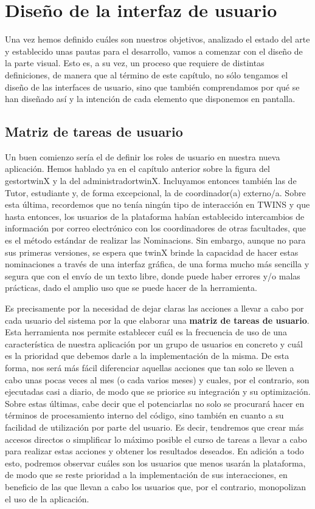 \chapter{Diseño de la interfaz de usuario}

Una vez hemos definido cuáles son nuestros objetivos, analizado el estado del arte y establecido unas pautas para el desarrollo, vamos a comenzar con el diseño de la parte visual. Esto es, a su vez, un proceso que requiere de distintas definiciones, de manera que al término de este capítulo, no sólo tengamos el diseño de las interfaces de usuario, sino que también comprendamos por qué se han diseñado así y la intención de cada elemento que disponemos en pantalla.

\section{Matriz de tareas de usuario}

Un buen comienzo sería el de definir los roles de usuario en nuestra nueva aplicación. Hemos hablado ya en el capítulo anterior sobre la figura del \gls{gestortwinX} y la del \gls{administradortwinX}. Incluyamos entonces también las de \gls{Tutor}, estudiante y, de forma excepcional, la de coordinador(a) externo/a. Sobre esta última, recordemos que no tenía ningún tipo de interacción en TWINS y que hasta entonces, los usuarios de la plataforma habían establecido intercambios de información por correo electrónico con los coordinadores de otras facultades, que es el método estándar de realizar las \glspl{Nominacion}. Sin embargo, aunque no para sus primeras versiones, se espera que twinX brinde la capacidad de hacer estas nominaciones a través de una interfaz gráfica, de una forma mucho más sencilla y segura que con el envío de un texto libre, donde puede haber errores y/o malas prácticas, dado el amplio uso que se puede hacer de la herramienta.

Es precisamente por la necesidad de dejar claras las acciones a llevar a cabo por cada usuario del sistema por la que elaborar una \textbf{matriz de tareas de usuario}. Esta herramienta nos permite establecer cuál es la frecuencia de uso de una característica de nuestra aplicación por un grupo de usuarios en concreto y cuál es la prioridad que debemos darle a la implementación de la misma. De esta forma, nos será más fácil diferenciar aquellas acciones que tan solo se lleven a cabo unas pocas veces al mes (o cada varios meses) y cuales, por el contrario, son ejecutadas casi a diario, de modo que se priorice su integración y su optimización. Sobre estas últimas, cabe decir que el potenciarlas no solo se procurará hacer en términos de procesamiento interno del código, sino también en cuanto a su facilidad de utilización por parte del usuario. Es decir, tendremos que crear más accesos directos o simplificar lo máximo posible el curso de tareas a llevar a cabo para realizar estas acciones y obtener los resultados deseados. En adición a todo esto, podremos observar cuáles son los usuarios que menos usarán la plataforma, de modo que se reste prioridad a la implementación de sus interacciones, en beneficio de las que llevan a cabo los usuarios que, por el contrario, monopolizan el uso de la aplicación. \cite{matrizTareas}

